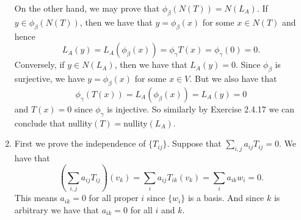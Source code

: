 \begin{enumerate}
On the other hand, we may prove that $\phi_{\beta}(N(T))=N(L_A)$. If $y\in \phi_{\beta}(N(T))$, then we have that $y=\phi_{\beta}(x)$ for some $x\in N(T)$ and hence \[L_A(y)=L_A(\phi_{\beta}(x))=\phi_{\gamma}T(x)=\phi_{\gamma}(0)=0.\]
Conversely, if $y\in N(L_A)$, then we have that $L_A(y)=0$. Since $\phi_{\beta}$ is surjective, we have $y=\phi_{\beta}(x)$ for some $x\in V$. But we also have that 
\[\phi_{\gamma}(T(x))=L_A(\phi_{\beta}(x))=L_A(y)=0\]
and $T(x)=0$ since $\phi_{\gamma}$ is injective. So similarly by Exercise 2.4.17 we can conclude that nullity$(T)=$nullity$(L_A)$.
\item First we prove the independence of $\{T_{ij}\}$. Suppose that $\sum_{i,j}{a_{ij}T_{ij}}=0$. We have that 
\[(\sum_{i,j}{a_{ij}T_{ij}})(v_k)=\sum_{i}{a_{ij}T_{ik}(v_k)}=\sum_{i}{a_{ik}w_i}=0.\]
This means $a_{ik}=0$ for all proper $i$ since $\{w_i\}$ is a basis. And since $k$ is arbitrary we have that $a_{ik}=0$ for all $i$ and $k$.


\end{enumerate}

